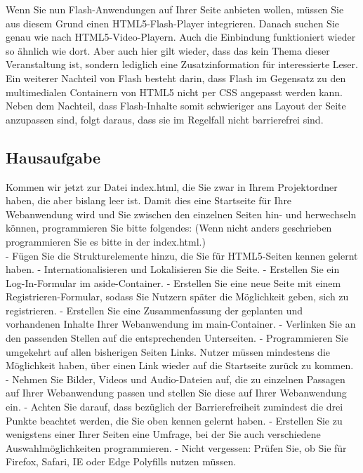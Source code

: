 Wenn Sie nun Flash-Anwendungen auf Ihrer Seite anbieten wollen, müssen Sie aus diesem Grund einen HTML5-Flash-Player integrieren. Danach suchen Sie genau wie nach HTML5-Video-Playern. Auch die Einbindung funktioniert wieder so ähnlich wie dort. Aber auch hier gilt wieder, dass das kein Thema dieser Veranstaltung ist, sondern lediglich eine Zusatzinformation für interessierte Leser.\\

Ein weiterer Nachteil von Flash besteht darin, dass Flash im Gegensatz zu den multimedialen Containern von HTML5 nicht per CSS angepasst werden kann. Neben dem Nachteil, dass Flash-Inhalte somit schwieriger ans Layout der Seite anzupassen sind, folgt daraus, dass sie im Regelfall nicht barrierefrei sind.

\subsection{Hausaufgabe}

Kommen wir jetzt zur Datei index.html, die Sie zwar in Ihrem Projektordner haben, die aber bislang leer ist. Damit dies eine Startseite für Ihre Webanwendung wird und Sie zwischen den einzelnen Seiten hin- und herwechseln können, programmieren Sie bitte folgendes: (Wenn nicht anders geschrieben programmieren Sie es bitte in der index.html.)\\

-	Fügen Sie die Strukturelemente hinzu, die Sie für HTML5-Seiten kennen gelernt haben.
-	Internationalisieren und Lokalisieren Sie die Seite.
-	Erstellen Sie ein Log-In-Formular im aside-Container.
-	Erstellen Sie eine neue Seite mit einem Registrieren-Formular, sodass Sie Nutzern später die Möglichkeit geben, sich zu registrieren. 
-	Erstellen Sie eine Zusammenfassung der geplanten und vorhandenen Inhalte Ihrer Webanwendung im main-Container.
-	Verlinken Sie an den passenden Stellen auf die entsprechenden Unterseiten.
-	Programmieren Sie umgekehrt auf allen bisherigen Seiten Links. Nutzer müssen mindestens die Möglichkeit haben, über einen Link wieder auf die Startseite zurück zu kommen.
-	Nehmen Sie Bilder, Videos und Audio-Dateien auf, die zu einzelnen Passagen auf Ihrer Webanwendung passen und stellen Sie diese auf Ihrer Webanwendung ein.
-	Achten Sie darauf, dass bezüglich der Barrierefreiheit zumindest die drei Punkte beachtet werden, die Sie oben kennen gelernt haben.
-	Erstellen Sie zu wenigstens einer Ihrer Seiten eine Umfrage, bei der Sie auch verschiedene Auswahlmöglichkeiten programmieren.
-	Nicht vergessen: Prüfen Sie, ob Sie für Firefox, Safari, IE oder Edge Polyfills nutzen müssen.

